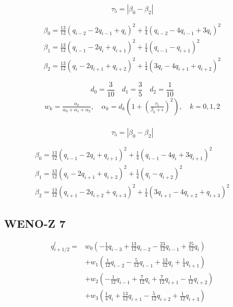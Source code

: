 \begin{equation}
\tau_5=\left|\beta_0-\beta_2\right|
\end{equation}

\begin{equation}
\begin{array}{l}
\beta_{0}=\frac{13}{12}\left(q_{i-2}-2 q_{i-1}+q_{i}\right)^{2}+\frac{1}{4}\left(q_{i-2}-4 q_{i-1}+3 q_{i}\right)^{2}\\
\beta_{1}=\frac{13}{12}\left(q_{i-1}-2 q_{i}+q_{i+1}\right)^{2}+\frac{1}{4}\left(q_{i-1}-q_{i+1}\right)^{2}\\
\beta_{2}=\frac{13}{12}\left(q_{i}-2 q_{i+1}+q_{i+2}\right)^{2}+\frac{1}{4}\left(3 q_{i}-4 q_{i+1}+q_{i+2}\right)^{2}
\end{array}
\end{equation}

$$d_0=\frac{3}{10} \quad d_1=\frac{3}{5} \quad d_2=\frac{1}{10}$$
\begin{equation}
\begin{array}{l}
w_{k}=\frac{\alpha_{k}}{\alpha_{0}+\alpha_{1}+\alpha_{2}}, \quad \alpha_{k}=d_k\left(1+\left(\frac{\tau_5}{\beta_{k}+\epsilon}\right)^2\right), \quad k=0,1,2\\
\end{array}
\end{equation}

\begin{equation}
\tau_5=\left|\beta_0-\beta_2\right|
\end{equation}

\begin{equation}
\begin{array}{l}
\beta_{0}=\frac{13}{12}\left(q_{i-1}-2 q_{i}+q_{i+1}\right)^{2}+\frac{1}{4}\left(q_{i-1}-4 q_{i}+3 q_{i+1}\right)^{2}\\
\beta_{1}=\frac{13}{12}\left(q_{i}-2 q_{i+1}+q_{i+2}\right)^{2}+\frac{1}{4}\left(q_{i}-q_{i+2}\right)^{2}\\
\beta_{2}=\frac{13}{12}\left(q_{i+1}-2 q_{i+2}+q_{i+3}\right)^{2}+\frac{1}{4}\left(3 q_{i+1}-4 q_{i+2}+q_{i+3}\right)^{2}
\end{array}
\end{equation}

\subsection{WENO-Z 7}
\begin{equation}
\begin{aligned}
q_{i+1 / 2}^{l}=& w_{0}\left(-\frac{1}{4} q_{i-3}+\frac{13}{12} q_{i-2}-\frac{23}{12} q_{i-1}+\frac{25}{12} q_{i}\right) \\
&+w_{1}\left(\frac{1}{12} q_{i-2}-\frac{5}{12} q_{i-1}+\frac{13}{12} q_{i}+\frac{1}{4} q_{i+1}\right) \\
&+w_{2}\left(-\frac{1}{12} q_{i-1}+\frac{7}{12} q_{i}+\frac{7}{12} q_{i+1}-\frac{1}{12} q_{i+2}\right) \\
&+w_{3}\left(\frac{1}{4} q_{i}+\frac{13}{12} q_{i+1}-\frac{5}{12} q_{i+2}+\frac{1}{12} q_{i+3}\right)
\end{aligned}
\end{equation}

